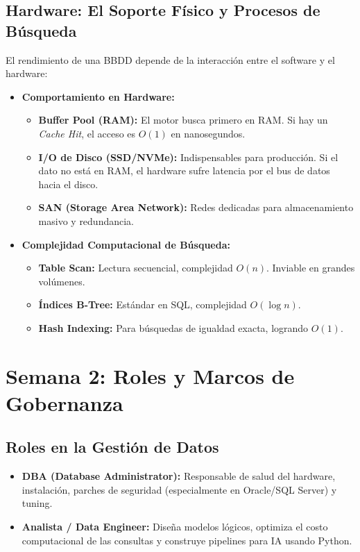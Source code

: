 \documentclass[12pt,a4paper,openany,oneside]{book}
\begin{document}
\subsection{Hardware: El Soporte Físico y Procesos de Búsqueda}
El rendimiento de una BBDD depende de la interacción entre el software y el hardware:
\begin{itemize}
    \item \textbf{Comportamiento en Hardware:}
    \begin{itemize}
        \item \textbf{Buffer Pool (RAM):} El motor busca primero en RAM. Si hay un \textit{Cache Hit}, el acceso es $O(1)$ en nanosegundos.
        \item \textbf{I/O de Disco (SSD/NVMe):} Indispensables para producción. Si el dato no está en RAM, el hardware sufre latencia por el bus de datos hacia el disco.
        \item \textbf{SAN (Storage Area Network):} Redes dedicadas para almacenamiento masivo y redundancia.
    \end{itemize}
    \item \textbf{Complejidad Computacional de Búsqueda:}
    \begin{itemize}
        \item \textbf{Table Scan:} Lectura secuencial, complejidad $O(n)$. Inviable en grandes volúmenes.
        \item \textbf{Índices B-Tree:} Estándar en SQL, complejidad $O(\log n)$.
        \item \textbf{Hash Indexing:} Para búsquedas de igualdad exacta, logrando $O(1)$.
    \end{itemize}
\end{itemize}



\section{Semana 2: Roles y Marcos de Gobernanza}

\subsection{Roles en la Gestión de Datos}
\begin{itemize}
    \item \textbf{DBA (Database Administrator):} Responsable de salud del hardware, instalación, parches de seguridad (especialmente en Oracle/SQL Server) y tuning.
    \item \textbf{Analista / Data Engineer:} Diseña modelos lógicos, optimiza el costo computacional de las consultas y construye pipelines para IA usando Python.
\end{itemize}
\end{document}

